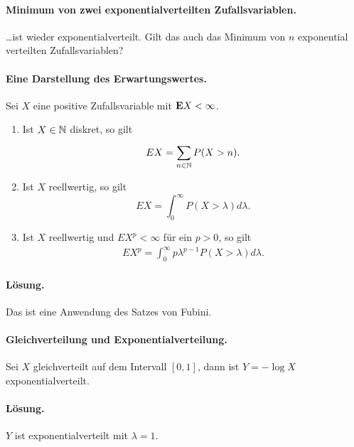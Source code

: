 

\paragraph{Minimum von zwei exponentialverteilten Zufallsvariablen. } \ldots ist 
wieder exponentialverteilt. Gilt das auch das Minimum von $n$ exponential
verteilten Zufallsvariablen?


\paragraph{Eine Darstellung des Erwartungswertes. } Sei $X$ eine
positive Zufallsvariable mit $\mathbf{E} X < \infty$. 
\begin{enumerate}
    \item Ist $X \in \mathbb N$ diskret, so gilt
        \begin{equation}
            E X = \sum_{n\in\mathbb N}^{} P(X>n).
        \end{equation}
    \item Ist $X$ reellwertig, so gilt
        \begin{equation}
            E X = \int_{0}^{\infty} P(X>\lambda) d\lambda.
        \end{equation}
    \item Ist $X$ reellwertig und $E X^p<\infty$ für ein $p>0$, so gilt
        \begin{eqnarray}
            E X^p = \int_{0}^{\infty} p\lambda^{p-1} P(X>\lambda) d\lambda.
        \end{eqnarray}
\end{enumerate} 

\paragraph*{Lösung.} Das ist eine Anwendung des Satzes von Fubini.


\paragraph{Gleichverteilung und Exponentialverteilung. } Sei $X$ gleichverteilt
auf dem Intervall $[0,1]$, dann ist $Y = -\log X$ exponentialverteilt.

\paragraph*{Lösung. } $Y$ ist exponentialverteilt mit $\lambda=1$.



